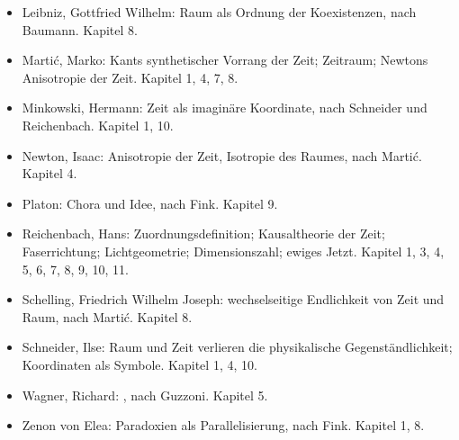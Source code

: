 \begin{itemize}
\item Leibniz, Gottfried Wilhelm: Raum als Ordnung der Koexistenzen, nach Baumann. Kapitel 8.
\item Martić, Marko: Kants synthetischer Vorrang der Zeit; Zeitraum; Newtons Anisotropie der Zeit. Kapitel 1, 4, 7, 8.
\item Minkowski, Hermann: Zeit als imaginäre Koordinate, nach Schneider und Reichenbach. Kapitel 1, 10.
\item Newton, Isaac: Anisotropie der Zeit, Isotropie des Raumes, nach Martić. Kapitel 4.
\item Platon: Chora und Idee, nach Fink. Kapitel 9.
\item Reichenbach, Hans: Zuordnungsdefinition; Kausaltheorie der Zeit; Faserrichtung; Lichtgeometrie; Dimensionszahl; ewiges Jetzt. Kapitel 1, 3, 4, 5, 6, 7, 8, 9, 10, 11.
\item Schelling, Friedrich Wilhelm Joseph: wechselseitige Endlichkeit von Zeit und Raum, nach Martić. Kapitel 8.
\item Schneider, Ilse: Raum und Zeit verlieren die physikalische Gegenständlichkeit; Koordinaten als Symbole. Kapitel 1, 4, 10.
\item Wagner, Richard: , nach Guzzoni. Kapitel 5.
\item Zenon von Elea: Paradoxien als Parallelisierung, nach Fink. Kapitel 1, 8.
\end{itemize}
